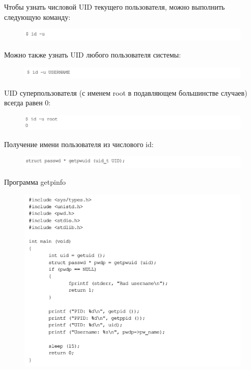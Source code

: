 \documentclass{beamer}
\begin{document}
\begin{frame}
Чтобы узнать числовой UID текущего пользователя, можно выполнить следующую
команду:
\begin{figure}[h]
\centering
\includegraphics[scale=0.4]{images/lec07-pic26.png}
\end{figure}
Можно также узнать UID любого пользователя системы:
\begin{figure}[h]
\centering
\includegraphics[scale=0.4]{images/lec07-pic27.png}
\end{figure}
UID суперпользователя (с именем root в подавляющем большинстве случаев) всегда равен 0:
\begin{figure}[h]
\centering
\includegraphics[scale=0.4]{images/lec07-pic28.png}
\end{figure}
\end{frame}

\begin{frame}
Получение имени пользователя из числового id:
\begin{figure}[h]
\centering
\includegraphics[scale=0.4]{images/lec07-pic29.png}
\end{figure}
Программа getpinfo
\begin{figure}[h]
\centering
\includegraphics[scale=0.4]{images/lec07-pic30.png}
\end{figure}
\end{frame}
\end{document}
